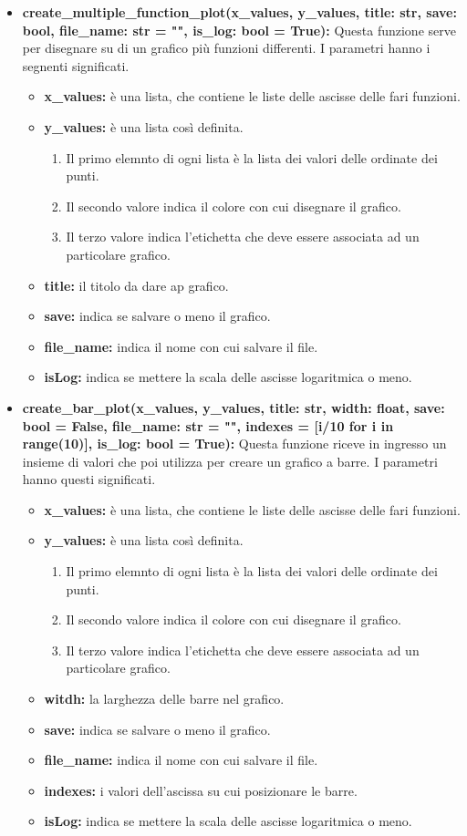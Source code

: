 \documentclass{article}
\newcommand{\newlineitem}[1]{\item \textbf{#1} \hfill \break}
\begin{document}
\begin{itemize}
\newlineitem{create\_multiple\_function\_plot(x\_values, y\_values, title: str, save: bool, file\_name: str = "", is\_log: bool = True):}
Questa funzione serve per disegnare su di un grafico più funzioni differenti. I parametri hanno i segnenti significati.
\begin{itemize}
\item \textbf{x\_values:} è una lista, che contiene le liste delle ascisse delle fari funzioni.
\item \textbf{y\_values:} è una lista così definita.
\begin{enumerate}
\item Il primo elemnto di ogni lista è la lista dei valori delle ordinate dei punti.
\item Il secondo valore indica il colore con cui disegnare il grafico.
\item Il terzo valore indica l'etichetta che deve essere associata ad un particolare grafico.
\end{enumerate}
\item \textbf{title:} il titolo da dare ap grafico.
\item \textbf{save:} indica se salvare o meno il grafico.
\item \textbf{file\_name:} indica il nome con cui salvare il file.
\item \textbf{isLog:} indica se mettere la scala delle ascisse logaritmica o meno.
\end{itemize}
\newlineitem{create\_bar\_plot(x\_values, y\_values, title: str, width: float, save: bool = False, file\_name: str = "", indexes = [i/10 for i in range(10)], is\_log: bool = True):}
Questa funzione riceve in ingresso un insieme di valori che poi utilizza per creare un grafico a barre. I parametri hanno questi significati.
\begin{itemize}
\item \textbf{x\_values:} è una lista, che contiene le liste delle ascisse delle fari funzioni.
\item \textbf{y\_values:} è una lista così definita.
\begin{enumerate}
\item Il primo elemnto di ogni lista è la lista dei valori delle ordinate dei punti.
\item Il secondo valore indica il colore con cui disegnare il grafico.
\item Il terzo valore indica l'etichetta che deve essere associata ad un particolare grafico.
\end{enumerate}
\item \textbf{witdh:} la larghezza delle barre nel grafico.
\item \textbf{save:} indica se salvare o meno il grafico.
\item \textbf{file\_name:} indica il nome con cui salvare il file.
\item \textbf{indexes:} i valori dell'ascissa su cui posizionare le barre.
\item \textbf{isLog:} indica se mettere la scala delle ascisse logaritmica o meno.
\end{itemize}
\end{itemize}
\end{document}
